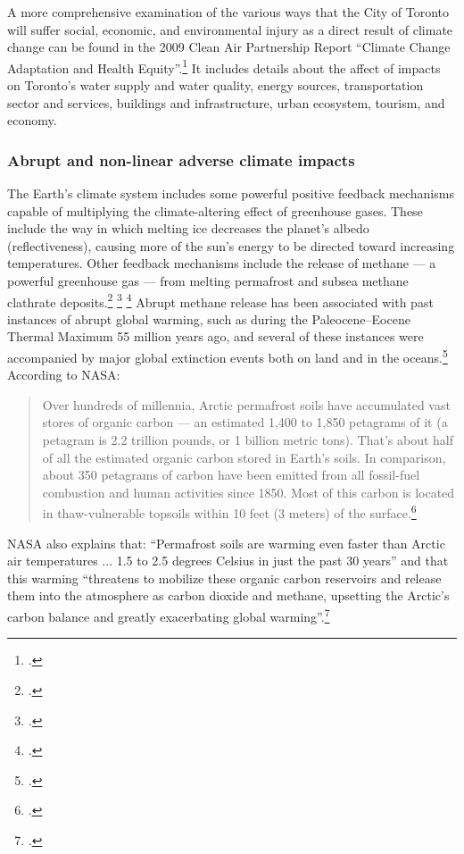 A more comprehensive examination of the various ways that the City of Toronto will suffer social, economic, and environmental injury as a direct result of climate change can be found in the 2009 Clean Air Partnership Report ``Climate Change Adaptation and Health Equity''.\footcite[][]{CCAHealthEquity}
It includes details about the affect of impacts on Toronto's water supply and water quality, energy sources, transportation sector and services, buildings and infrastructure, urban ecosystem, tourism, and economy.  



	\subsubsection{Abrupt and non-linear adverse climate impacts}



The Earth's climate system includes some powerful positive feedback mechanisms capable of multiplying the climate-altering effect of greenhouse gases.
These include the way in which melting ice decreases the planet's albedo (reflectiveness), causing more of the sun's energy to be directed toward increasing temperatures.
Other feedback mechanisms include the release of methane --- a powerful greenhouse gas --- from melting permafrost and subsea methane clathrate deposits.\footcite[See: ][]{VastCostsArctic} \footcite[See also: ][]{Thermokast2013} \footcite[See also: ][]{VidalTimebomb}
Abrupt methane release has been associated with past instances of abrupt global warming, such as during the Paleocene–Eocene Thermal Maximum 55 million years ago, and several of these instances were accompanied by major global extinction events both on land and in the oceans.\footcite[See: ][]{Hansen2010}
According to NASA:
\begin{quote}
Over hundreds of millennia, Arctic permafrost soils have accumulated vast stores of organic carbon --- an estimated 1,400 to 1,850 petagrams of it (a petagram is 2.2 trillion pounds, or 1 billion metric tons). That's about half of all the estimated organic carbon stored in Earth's soils. In comparison, about 350 petagrams of carbon have been emitted from all fossil-fuel combustion and human activities since 1850. Most of this carbon is located in thaw-vulnerable topsoils within 10 feet (3 meters) of the surface.\footcite[][]{SleepingGiant}
\end{quote}
NASA also explains that: ``Permafrost soils are warming even faster than Arctic air temperatures ... 1.5 to 2.5 degrees Celsius in just the past 30 years'' and that this warming ``threatens to mobilize these organic carbon reservoirs and release them into the atmosphere as carbon dioxide and methane, upsetting the Arctic's carbon balance and greatly exacerbating global warming''.\footcite[][]{SleepingGiant}



